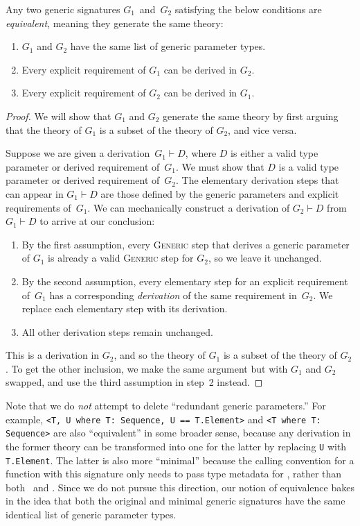 \documentclass[../generics]{subfiles}
\begin{document}
\begin{proposition}\label{equiv generic signatures}
Any two generic signatures $G_1$~and~$G_2$ satisfying the below conditions are \emph{equivalent}, meaning they generate the same theory:
\begin{enumerate}
\item $G_1$ and $G_2$ have the same list of generic parameter types.
\item Every explicit requirement of $G_1$ can be derived in $G_2$.
\item Every explicit requirement of $G_2$ can be derived in $G_1$.
\end{enumerate}
\end{proposition}
\begin{proof}
We will show that $G_1$ and $G_2$ generate the same theory by first arguing that the theory of $G_1$ is a subset of the theory of $G_2$, and vice versa.

Suppose we are given a derivation~$G_1\vdash D$, where $D$ is either a valid type parameter or derived requirement of~$G_1$. We must show that $D$ is a valid type parameter or derived requirement of~$G_2$. The elementary derivation steps that can appear in $G_1\vdash D$ are those defined by the generic parameters and explicit requirements of~$G_1$. We can mechanically construct a derivation of $G_2\vdash D$ from $G_1\vdash D$ to arrive at our conclusion:
\begin{enumerate}
\item By the first assumption, every \textsc{Generic} step that derives a generic parameter of $G_1$ is already a valid \textsc{Generic} step for $G_2$, so we leave it unchanged.
\item By the second assumption, every elementary step for an explicit requirement of~$G_1$ has a corresponding \emph{derivation} of the same requirement in~$G_2$. We replace each elementary step with its derivation.
\item All other derivation steps remain unchanged.
\end{enumerate}
This is a derivation in $G_2$, and so the theory of $G_1$ is a subset of the theory of $G_2$. To get the other inclusion, we make the same argument but with $G_1$ and $G_2$ swapped, and use the third assumption in step~2 instead.
\end{proof}

Note that we do \emph{not} attempt to delete ``redundant generic parameters.'' For example, \verb|<T, U where T: Sequence, U == T.Element>| and \verb|<T where T: Sequence>| are also ``equivalent'' in some broader sense, because any derivation in the former theory can be transformed into one for the latter by replacing \verb|U| with \verb|T.Element|. The latter is also more ``minimal'' because the calling convention for a function with this signature only needs to pass type metadata for \tT, rather than both \tT\ and \tU. Since we do not pursue this direction, our notion of equivalence bakes in the idea that both the original and minimal generic signatures have the same identical list of generic parameter types.
\end{document}

